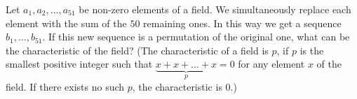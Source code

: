 \documentclass{article}
\begin{document}
\setlength{\parindent}{0pt}
Let $a_{1},a_{2},\dots,a_{51}$ be non-zero elements of a field. We simultaneously replace each element with the sum of the $50$ remaining ones. In this way we get a sequence $b_{1},\dots,b_{51}$. If this new sequence is a permutation of the original one, what can be the characteristic of the field? (The characteristic of a field is $p$, if $p$ is the smallest positive integer such that $\underbrace{x+x+\dots+x}_{p}=0$ for any element $x$ of the field. If there exists no such $p$, the characteristic is $0$.)
\end{document}
